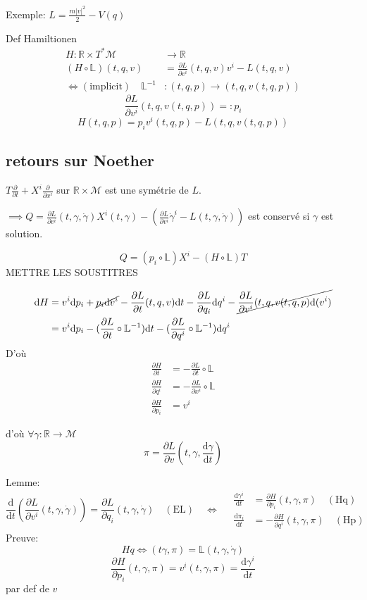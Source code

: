 \documentclass[a4paper,11pt]{article}
\renewcommand{\d}{{\mathrm{d}}}
\newcommand{\dr}[2]{\frac{\partial {#1}}{\partial{#2}}}
\begin{document}
Exemple: $L = \frac{m |v|^2}{2} - V(q)$

Def Hamiltionen
\begin{align*}
H : \mathbb{R}\times T^*\mathcal{M} &\to \mathbb{R}\\
(H\circ\mathbb{L})(t,q,v) &= \dr{L}{v^i}(t,q,v) v^i - L(t,q,v)\\
\iff (\mathrm{implicit})\quad  \mathbb{L}^{-1}&: (t,q,p)\to (t,q,v(t,q,p))
\end{align*}
$$\dr{L}{v^i}(t,q,v(t,q,p)) =: p_i $$
$$H(t,q,p) = p_i v^i(t,q,p) - L(t,q,v(t,q,p))$$

\subsection{retours sur Noether}
$T\frac{\partial}{\partial t} + X^i \frac{\partial}{\partial x^i}$ sur $\mathbb{R}\times\mathcal{M}$ est une symétrie de $L$.

$\implies Q = \dr{L}{v^i}(t,\gamma, \dot\gamma)X^i(t,\gamma) - (\dr{L}{v^i}\dot\gamma^i - L(t,\gamma,\dot\gamma))$ est conservé si $\gamma$ est solution.

$$Q = (p_i \circ \mathbb{L})X^i - (H\circ\mathbb{L})T$$
METTRE LES SOUSTITRES

\begin{align*}
\d H &= v^i \d p_i + \cancel{p_i\d v^i} - \dr{L}{t}(t,q,v) \d t - \dr{L}{q_i}\d q^i - \cancel{\dr{L}{v^i}(t,q,v(t,q,p) \d(v^i)}\\
&= v^i\d p_i - (\dr{L}{t}\circ \mathbb{L}^{-1})\d t - (\dr{L}{q^i}\circ \mathbb{L}^{-1}) \d q^i
\end{align*}
D'où 
\begin{align}
	\dr{H}{t} &= -\dr{L}{t}\circ \mathbb{L}\\
	\dr{H}{q^i} &= - \dr{L}{x^i} \circ \mathbb{L}\\
	\dr{H}{p_i} &= v^i
\end{align}

d'où $\forall \gamma:\mathbb{R} \to \mathcal{M}$
$$\pi = \dr{L}{v}(t,\gamma,\frac{\d \gamma}{\d t})$$

Lemme:
\begin{equation}
\frac{\d}{\d t} (\dr L{v^i} (t,\gamma, \dot \gamma)) = \dr L{q_i} (t,\gamma,\dot\gamma)\quad (\mathrm{EL}) \quad \iff \quad
\begin{split} \frac{\d \gamma^i}{\d t}&=\dr{H}{p_i}(t,\gamma,\pi) \quad (\mathrm{Hq})\\
\frac{\d \pi_i}{\d t}&=-\dr{H}{q^i}(t,\gamma,\pi) \quad (\mathrm{Hp})\end{split}
\end{equation}
Preuve:
$$Hq \iff (t\gamma,\pi) = \mathbb{L}(t,\gamma,\dot\gamma)$$
$$\dr{H}{p_i}(t,\gamma,\pi)=v^i(t,\gamma,\pi)=\frac{\d \gamma^i}{\d t}$$
par def de $v$
\end{document}
